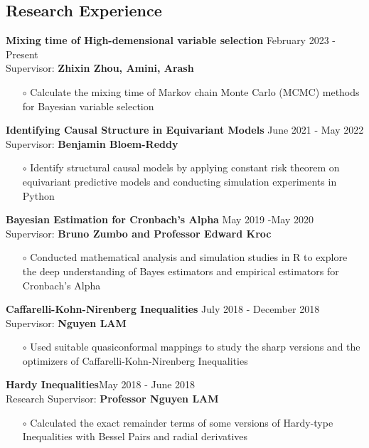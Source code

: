 \documentclass[margin,line]{res}
\begin{document}
\begin{resume}
\section{\sc Research Experience}
{\bf Mixing time of High-demensional variable selection } \hfill{February 2023 -  Present }\\{ Supervisor: \bf Zhixin Zhou, Amini, Arash}\begin{itemize}\item[$\circ$] Calculate the mixing time of Markov chain Monte Carlo (MCMC) methods for Bayesian variable selection
  \end{itemize}
{\bf Identifying Causal Structure in Equivariant Models } \hfill{June 2021 -  May 2022 }\\{  Supervisor:   \bf  Benjamin Bloem-Reddy}\begin{itemize}\item[$\circ$] Identify structural causal models by applying constant risk theorem on equivariant predictive models and conducting simulation experiments in Python
  \end{itemize}

{\bf Bayesian Estimation for Cronbach's Alpha} \hfill{May 2019 -May 2020}\\{  Supervisor:   \bf Bruno Zumbo and  Professor Edward Kroc}
\begin{itemize}\item[$\circ$]
 Conducted mathematical analysis and simulation studies in R to explore the deep understanding of Bayes estimators and empirical estimators for Cronbach's Alpha\end{itemize}

{\bf  Caffarelli-Kohn-Nirenberg Inequalities }\hfill{July 2018 - December 2018}\\{ Supervisor:   \bf  Nguyen LAM}\begin{itemize}\item[$\circ$]
 Used suitable quasiconformal mappings to study the sharp versions and the optimizers of Caffarelli-Kohn-Nirenberg Inequalities \end{itemize} 
 

{\bf Hardy Inequalities}\hfill{May 2018 - June 2018}\\{ Research Supervisor:  \bf Professor Nguyen LAM}\begin{itemize}\item[$\circ$]
 Calculated the exact remainder terms of some versions of Hardy-type Inequalities with Bessel Pairs and radial derivatives\end{itemize}




\end{resume}
\end{document}
